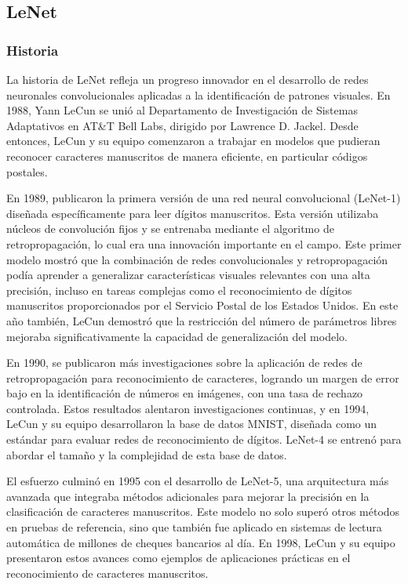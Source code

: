 \subsection{LeNet}

\subsubsection{Historia}

La historia de LeNet refleja un progreso innovador en el desarrollo 
de redes neuronales convolucionales aplicadas a la identificación de 
patrones visuales. En 1988, Yann LeCun se unió al Departamento de 
Investigación de Sistemas Adaptativos en AT\&T Bell Labs, dirigido 
por Lawrence D. Jackel. Desde entonces, LeCun y su equipo comenzaron 
a trabajar en modelos que pudieran reconocer caracteres manuscritos 
de manera eficiente, en particular códigos postales.

En 1989, publicaron la primera versión de una red neural convolucional
 (LeNet-1) diseñada específicamente para leer dígitos manuscritos. 
 Esta versión utilizaba núcleos de convolución fijos y se entrenaba
 mediante el algoritmo de retropropagación, lo cual era una innovación 
 importante en el campo. Este primer modelo mostró que la combinación 
 de redes convolucionales y retropropagación podía aprender a 
 generalizar características visuales relevantes con una alta precisión,
  incluso en tareas complejas como el reconocimiento de dígitos 
  manuscritos proporcionados por el Servicio Postal de los Estados 
  Unidos. En este año también, LeCun demostró que la restricción 
  del número de parámetros libres mejoraba significativamente la 
  capacidad de generalización del modelo.

En 1990, se publicaron más investigaciones sobre la aplicación de redes 
de retropropagación para reconocimiento de caracteres, logrando un 
margen de error bajo en la identificación de números en imágenes, 
con una tasa de rechazo controlada. Estos resultados alentaron 
investigaciones continuas, y en 1994, LeCun y su equipo desarrollaron 
la base de datos MNIST, diseñada como un estándar para evaluar redes 
de reconocimiento de dígitos. LeNet-4 se entrenó para abordar el tamaño 
y la complejidad de esta base de datos.

El esfuerzo culminó en 1995 con el desarrollo de LeNet-5, 
una arquitectura más avanzada que integraba métodos adicionales 
para mejorar la precisión en la clasificación de caracteres manuscritos. 
Este modelo no solo superó otros métodos en pruebas de referencia, 
sino que también fue aplicado en sistemas de lectura automática de 
millones de cheques bancarios al día. En 1998, LeCun y su equipo 
presentaron estos avances como ejemplos de aplicaciones prácticas en el 
reconocimiento de caracteres manuscritos.

